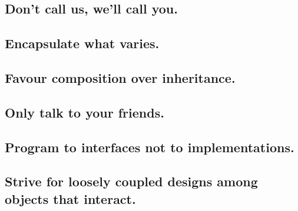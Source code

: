 \documentclass{beamer}
\begin{document}
\subsection{Don't call us, we'll call you.}

\begin{frame}{}
\end{frame}

\subsection{Encapsulate what varies.}

\begin{frame}{}
\end{frame}

\subsection{Favour composition over inheritance.}

\begin{frame}{}
\end{frame}

\subsection{Only talk to your friends.}

\begin{frame}{}
\end{frame}

\subsection{Program to interfaces not to implementations.}

\begin{frame}{}
\end{frame}

\subsection{Strive for loosely coupled designs among objects that interact.}

\begin{frame}{}
\end{frame}
\end{document}
